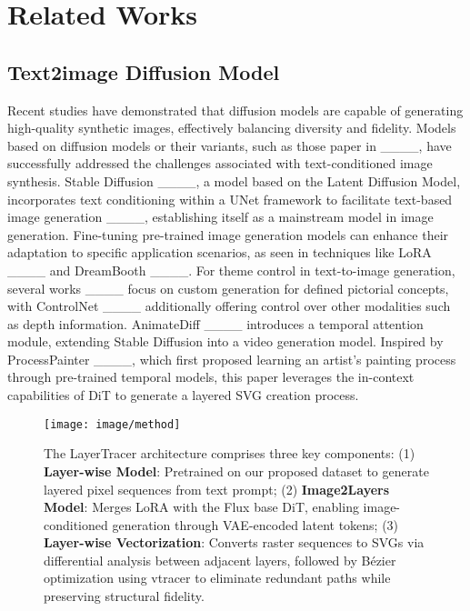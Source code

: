 \section{Related Works}
\subsection{Text2image Diffusion Model}

Recent studies have demonstrated that diffusion models are capable of generating high-quality synthetic images, effectively balancing diversity and fidelity. Models based on diffusion models or their variants, such as those paper in  ____, have successfully addressed the challenges associated with text-conditioned image synthesis. Stable Diffusion  ____, a model based on the Latent Diffusion Model, incorporates text conditioning within a UNet framework to facilitate text-based image generation ____, establishing itself as a mainstream model in image generation. Fine-tuning pre-trained image generation models can enhance their adaptation to specific application scenarios, as seen in techniques like LoRA  ____ and DreamBooth  ____. For theme control in text-to-image generation, several works  ____ focus on custom generation for defined pictorial concepts, with ControlNet  ____ additionally offering control over other modalities such as depth information.  AnimateDiff ____ introduces a temporal attention module, extending Stable Diffusion into a video generation model. Inspired by ProcessPainter ____, which first proposed learning an artist's painting process through pre-trained temporal models, this paper leverages the in-context capabilities of DiT to generate a layered SVG creation process.


\begin{figure*}[ht]
    \centering
    \texttt{[image: image/method]} %
    \caption{The LayerTracer architecture comprises three key components: (1) \textbf{Layer-wise Model}: Pretrained on our proposed dataset to generate layered pixel sequences from text prompt; (2) \textbf{Image2Layers Model}: Merges LoRA with the Flux base DiT, enabling image-conditioned generation through VAE-encoded latent tokens; (3) \textbf{Layer-wise Vectorization}: Converts raster sequences to SVGs via differential analysis between adjacent layers, followed by Bézier optimization using vtracer to eliminate redundant paths while preserving structural fidelity.}
    \label{method}
\end{figure*}


